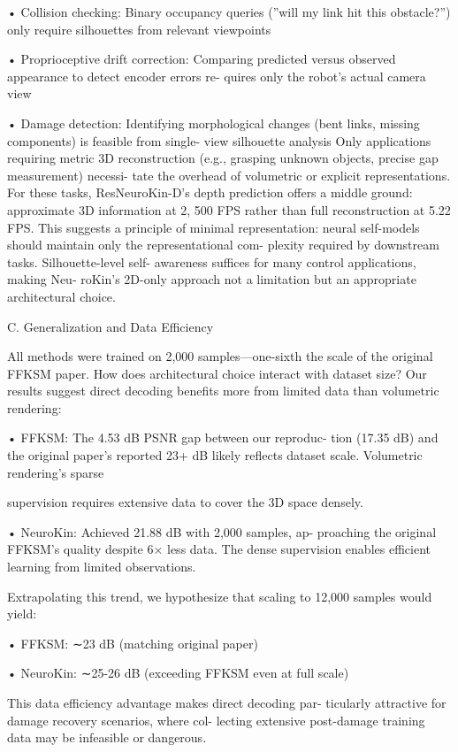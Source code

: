 \documentclass[10pt,twocolumn,letterpaper]{article}
\begin{document}
• Collision checking: Binary occupancy queries (”will my link hit this obstacle?”) only require silhouettes from relevant viewpoints

• Proprioceptive drift correction: Comparing predicted versus observed appearance to detect encoder errors re- quires only the robot’s actual camera view

• Damage detection: Identifying morphological changes (bent links, missing components) is feasible from single- view silhouette analysis Only applications requiring metric 3D reconstruction (e.g., grasping unknown objects, precise gap measurement) necessi- tate the overhead of volumetric or explicit representations. For these tasks, ResNeuroKin-D’s depth prediction offers a middle ground: approximate 3D information at 2, 500 FPS rather than full reconstruction at 5.22 FPS. This suggests a principle of minimal representation: neural self-models should maintain only the representational com- plexity required by downstream tasks. Silhouette-level self- awareness suffices for many control applications, making Neu- roKin’s 2D-only approach not a limitation but an appropriate architectural choice.

C. Generalization and Data Efficiency

All methods were trained on 2,000 samples—one-sixth the scale of the original FFKSM paper. How does architectural choice interact with dataset size? Our results suggest direct decoding benefits more from limited data than volumetric rendering:

• FFKSM: The 4.53 dB PSNR gap between our reproduc- tion (17.35 dB) and the original paper’s reported 23+ dB likely reflects dataset scale. Volumetric rendering’s sparse

supervision requires extensive data to cover the 3D space densely.

• NeuroKin: Achieved 21.88 dB with 2,000 samples, ap- proaching the original FFKSM’s quality despite 6× less data. The dense supervision enables efficient learning from limited observations.

Extrapolating this trend, we hypothesize that scaling to 12,000 samples would yield:

• FFKSM: ∼23 dB (matching original paper)

• NeuroKin: ∼25-26 dB (exceeding FFKSM even at full scale)

This data efficiency advantage makes direct decoding par- ticularly attractive for damage recovery scenarios, where col- lecting extensive post-damage training data may be infeasible or dangerous.
\end{document}
